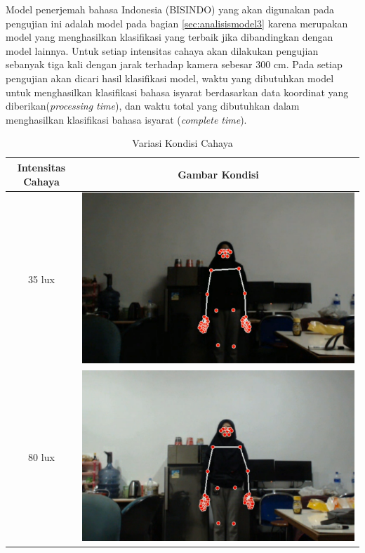 Model penerjemah bahasa Indonesia (BISINDO) yang akan digunakan pada pengujian ini adalah model pada bagian \ref{sec:analisismodel3} karena merupakan model yang menghasilkan klasifikasi yang terbaik jika dibandingkan dengan model lainnya. Untuk setiap intensitas cahaya akan dilakukan pengujian sebanyak tiga kali dengan jarak terhadap kamera sebesar 300 cm. Pada setiap pengujian akan dicari hasil klasifikasi model, waktu yang dibutuhkan model untuk menghasilkan klasifikasi bahasa isyarat berdasarkan data koordinat yang diberikan(\emph{processing time}), dan waktu total yang dibutuhkan dalam menghasilkan klasifikasi bahasa isyarat (\emph{complete time}).  

\begin{longtable}{|c|c|}
  \caption{Variasi Kondisi Cahaya}
  \label{tb:kondisicahaya}                                   \\
  \hline
  \rowcolor[HTML]{C0C0C0}
  \textbf{Intensitas Cahaya} & \textbf{Gambar Kondisi}  \\
  \hline
  35 lux            &  \includegraphics[scale=0.3]{gambar/bab4-gelap.png}                \\
  \hline
  80 lux            & \includegraphics[scale=0.3]{gambar/bab4-remang.png}                 \\

\end{longtable}
